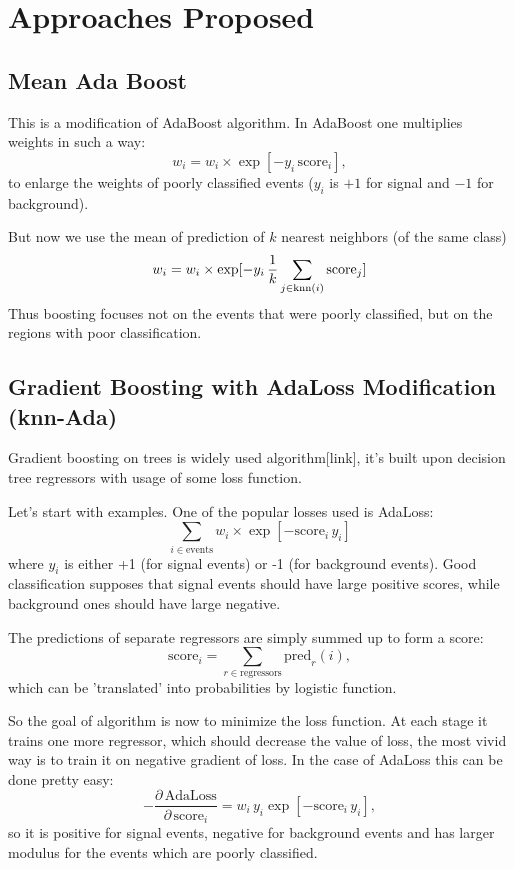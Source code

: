 \documentclass[12pt]{article}
\theoremstyle{definition}
\theoremstyle{remark}
\begin{document}
\section{Approaches Proposed}

\subsection{Mean Ada Boost}

This is a modification of AdaBoost algorithm. In AdaBoost one multiplies weights in such a way:
\[
	w_i = w_i \times \exp[-y_i \, \text{score}_i],
\]
to enlarge the weights of poorly classified events ($y_i$ is $+1$ for signal and $-1$ for background).

But now we use the mean of prediction of $k$ nearest neighbors (of the same class)
\[
	w_i = w_i \times \exp[-y_i \, \dfrac{1}{k} \sum_{j \in \text{knn}(i)} \text{score}_j]
\]
Thus boosting focuses not on the events that were poorly classified, but on the regions with poor classification.


\subsection{Gradient Boosting with AdaLoss Modification (knn-Ada)}

\def\score{\text{score}}
\def\knn{\text{knn}}
\def\FL{\text{FL}}

Gradient boosting on trees is widely used algorithm[link], it's built upon decision tree regressors with usage of some loss function. 

Let's start with examples. One of the popular losses used is AdaLoss:
\[
	\sum_{i \in \text{events}} w_i \times \exp [- \score_i \, y_i] 
\]
where $y_i$ is either +1 (for signal events) or -1 (for background events). Good classification supposes that signal events should have large positive scores, while background ones should have large negative.

The predictions of separate regressors are simply summed up to form a score:
\[
	\score_i = \sum_{r \in \text{regressors}} \text{pred}_r(i),
\]
which can be 'translated' into probabilities by logistic function.

So the goal of algorithm is now to minimize the loss function. At each stage it trains one more regressor, which should decrease the value of loss, the most vivid way is to train it on negative gradient of loss. In the case of AdaLoss this can be done pretty easy:
\[
	-\dfrac{\partial \, \text{AdaLoss}}{\partial \, \score_i} = w_i \, y_i \exp[- \score_i \, y_i],
\]
so it is positive for signal events, negative for background events and has larger modulus for the events which are poorly classified.
\end{document}
